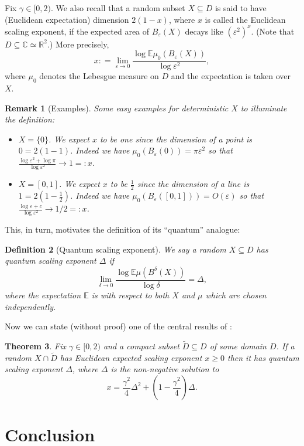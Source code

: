 \documentclass[11pt,reqno]{amsart}
\numberwithin{equation}{section}
\newtheorem{thm}{Theorem}[section]
\newtheorem{defi}[thm]{Definition}
\newtheorem{rem}[thm]{Remark}
\newcommand{\deq}{\mathrel{\mathop:}=}
\newcommand{\eps}{\varepsilon}
\begin{document}
Fix $\gamma\in[0,2)$. We also recall that a random subset $X\subseteq D$ is said to have (Euclidean expectation) dimension $2(1-x)$, where $x$ is called the Euclidean scaling exponent, if the expected area of $B_\eps(X)$ decays like $(\eps^2)^x$. (Note that $D\subseteq\mathbb C\simeq\mathbb R^2$.) More precisely, $$x\deq \lim_{\eps\rightarrow 0}\frac{\log \mathbb E\mu_0(B_\eps(X))}{\log\eps^2},$$ where $\mu_0$ denotes the Lebesgue measure on $D$ and the expectation is taken over $X$.
\begin{rem}[Examples]
	Some easy examples for deterministic $X$ to illuminate the definition:
	\begin{itemize}
		\item $X=\{0\}$. We expect $x$ to be one since the dimension of a point is $0 = 2(1-1)$. Indeed we have $\mu_0(B_\eps(0))=\pi\eps^2$ so that $\frac{\log\eps^2+\log\pi}{\log\eps^2}\rightarrow 1=:x$.
		\item $X=[0,1]$. We expect $x$ to be $\frac{1}{2}$ since the dimension of a line is $1=2(1-\frac{1}{2})$. Indeed we have $\mu_0(B_\eps([0,1]))=O(\eps)$ so that $\frac{\log\eps+c}{\log\eps^2}\rightarrow 1/2=:x$.
	\end{itemize}
\end{rem}

This, in turn, motivates the definition of its ``quantum'' analogue:
\begin{defi}[Quantum scaling exponent]
	We say a random $X\subseteq D$ has quantum scaling exponent $\Delta$ if $$\lim_{\delta\rightarrow 0}\frac{\log\mathbb E\mu(B^\delta(X))}{\log\delta}=\Delta,$$
	where the expectation $\mathbb E$ is with respect to both $X$ and $\mu$ which are chosen independently.
\end{defi}

Now we can state (without proof) one of the central results of \cite{Dup10}:

\begin{thm}\label{thm:KPZresult}
	Fix $\gamma\in[0,2)$ and a compact subset $\tilde D\subseteq D$ of some domain $D$. If a random $X\cap\tilde D$ has Euclidean expected scaling exponent $x\geq 0$ then it has quantum scaling exponent $\Delta$, where $\Delta$ is the non-negative solution to $$x=\frac{\gamma^2}{4}\Delta^2+\left(1-\frac{\gamma^2}{4}\right)\Delta.$$
\end{thm}

\section*{Conclusion}
\end{document}
